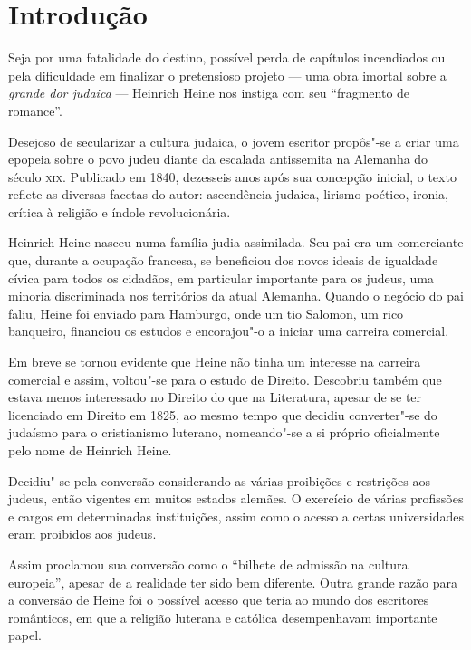 \documentclass[12pt]{extarticle}
\begin{document}
\tableofcontents

\section{Introdução}

Seja por uma fatalidade do destino, possível perda de capítulos 
incendiados ou pela dificuldade em finalizar o pretensioso projeto --- uma 
obra imortal sobre a \emph{grande dor judaica} --- Heinrich Heine nos 
instiga com seu ``fragmento de romance''.


Desejoso de secularizar a cultura judaica, o jovem escritor propôs"-se 
a criar uma epopeia sobre o povo judeu diante da escalada antissemita 
na Alemanha do século \textsc{xix}.
Publicado em 1840, dezesseis anos após sua concepção inicial, 
o texto reflete as diversas facetas do autor:
ascendência judaica, lirismo poético, ironia, crítica 
à religião e índole revolucionária.

Heinrich Heine nasceu numa família judia assimilada. Seu pai era 
um comerciante que, durante a ocupação francesa, se beneficiou dos 
novos ideais de igualdade cívica para todos os cidadãos, 
em particular importante para os judeus, uma minoria 
discriminada nos territórios da atual Alemanha. 
Quando o negócio do pai faliu, Heine foi enviado 
para Hamburgo, onde um tio Salomon, um rico banqueiro, 
financiou os estudos e encorajou"-o a iniciar uma carreira comercial.

Em breve se tornou evidente que Heine não tinha um interesse 
na carreira comercial e assim, voltou"-se para o estudo de Direito. 
Descobriu também que estava menos interessado no Direito do que 
na Literatura, apesar de se ter licenciado em Direito em 1825, 
ao mesmo tempo que decidiu converter"-se do judaísmo para o 
cristianismo luterano, nomeando"-se a si próprio oficialmente pelo nome de Heinrich Heine.

Decidiu"-se pela conversão considerando as várias proibições e 
restrições aos judeus, então vigentes em muitos estados alemães. 
O exercício de várias profissões e cargos em determinadas 
instituições, assim como o acesso a certas universidades eram proibidos aos judeus. 

Assim proclamou sua conversão como o ``bilhete de admissão na cultura europeia'', 
apesar de a realidade ter sido bem diferente. Outra grande 
razão para a conversão de Heine foi o possível acesso que teria 
ao mundo dos escritores românticos, em que a religião luterana e 
católica desempenhavam importante papel.
\end{document}
